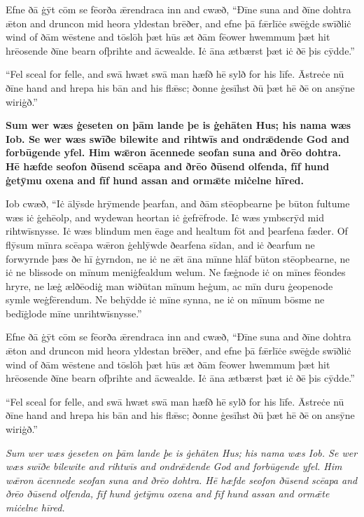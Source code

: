 \documentclass[letterpaper]{article}
\begin{document}
Efne ðā ġȳt cōm se fēorða ǣrendraca inn and cwæð, “Ðīne suna and ðīne dohtra ǣton and druncon mid heora yldestan brēðer, and efne þā fǣrlīċe swēġde swīðliċ wind of ðām wēstene and tōslōh þæt hūs æt ðām fēower hwemmum þæt hit hrēosende ðīne bearn ofþrihte and ācwealde. Iċ āna ætbærst þæt iċ ðē þis cȳdde.”

“Fel sceal for felle, and swā hwæt swā man hæfð hē sylð for his līfe.  Āstreċe nū ðīne hand and hrepa his bān and his flǣsc; ðonne ġesīhst ðū þæt hē ðē on ansȳne wiriġð.”

\pagebreak

\upshape\bfseries\noindent Sum wer wæs ġeseten on þām lande þe is ġehāten Hus; his nama wæs Iob.  Se wer wæs swīðe bilewite and rihtwīs and ondrǣdende God and forbūgende yfel.  Him wǣron ācennede \mbox{seofan} suna and ðrēo dohtra.  Hē hæfde seofon ðūsend scēapa and ðrēo ðūsend olfenda, fīf hund ġetȳmu oxena and fīf hund assan and ormǣte miċelne hīred.

Iob cwæð, “Iċ ālȳsde hrȳmende þearfan, and ðām stēopbearne þe būton fultume wæs iċ ġehēolp, and wydewan heort\-an iċ ġefrēfrode.  Iċ wæs ymbscrȳd mid rihtwīsnysse.  Iċ wæs blind\-um men ēage and healtum fōt and þearfena fæder.  Of flȳsum mīnra scēapa wǣron ġehlȳwde ðearfena sīdan, and iċ ðearfum ne forwyrnde þæs ðe hī ġyrndon, ne iċ ne ǣt āna mīnne hlāf būton stēopbearne, ne iċ ne blissode on mīnum meniġfealdum welum.  Ne fæġnode iċ on mīnes fēondes hryre, ne læġ ælðēodiġ man wiðūtan mīnum heġum, ac mīn duru ġeopenode symle weġfērendum.  Ne behȳdde iċ mīne synna, ne iċ on mīnum bōsme ne bedīġlode mīne unrihtwīsnysse.”

Efne ðā ġȳt cōm se fēorða ǣrendraca inn and cwæð, “Ðīne suna and ðīne dohtra ǣton and druncon mid heora yldestan brēðer, and efne þā fǣrlīċe swēġde swīðliċ wind of ðām wēst\-ene and tōslōh þæt hūs æt ðām fēower hwemmum þæt hit hrēosende ðīne bearn ofþrihte and ācwealde. Iċ āna ætbærst þæt iċ ðē þis cȳdde.”

“Fel sceal for felle, and swā hwæt swā man hæfð hē sylð for his līfe.  Āstreċe nū ðīne hand and hrepa his bān and his flǣsc; ðonne ġesīhst ðū þæt hē ðē on ansȳne wiriġð.”

\pagebreak

\noindent\itshape Sum wer wæs ġeseten on þām lande þe is ġehāten Hus; his nama wæs Iob.  Se wer wæs swīðe bilewite and rihtwīs and ondrǣdende God and forbūgende yfel.  Him wǣron ācennede \mbox{seofan} suna and ðrēo dohtra.  Hē hæfde seofon ðūsend scēapa and ðrēo ðūsend olfenda, fīf hund ġetȳmu oxena and fīf hund assan and ormǣte miċelne hīred.
\end{document}
